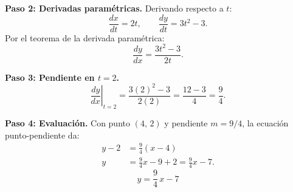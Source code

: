 \begin{example}
\begin{myproof}
\textbf{Paso 2: Derivadas paramétricas.}
Derivando respecto a $t$:
\[
  \frac{dx}{dt} = 2t, \qquad \frac{dy}{dt} = 3t^2 - 3.
\]
Por el teorema de la derivada paramétrica:
\[
  \frac{dy}{dx} = \frac{3t^2 - 3}{2t}.
\]
 
\textbf{Paso 3: Pendiente en $t = 2$.}
\[
  \left.\frac{dy}{dx}\right|_{t=2}
  = \frac{3(2)^2 - 3}{2(2)} = \frac{12 - 3}{4} = \frac{9}{4}.
\]
 
\textbf{Paso 4: Evaluación.}
Con punto $(4,\,2)$ y pendiente $m = 9/4$, la ecuación punto-pendiente da:
\begin{align*}
  y - 2 &= \frac{9}{4}(x - 4) \\[4pt]
  y     &= \frac{9}{4}x - 9 + 2 = \frac{9}{4}x - 7.
\end{align*}
\[
  \boxed{y = \dfrac{9}{4}\,x - 7}
\]
\end{myproof}
\end{example}
 
